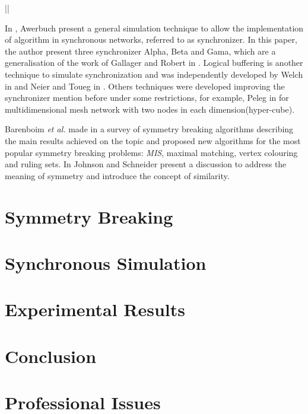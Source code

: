 ||\documentclass[11pt]{article} %
\theoremstyle{plain}
\theoremstyle{definition}
\begin{document}
 

In \cite{awerbuch1985complexity}, Awerbuch present a general simulation technique to allow the implementation of algorithm in synchronous networks, referred to as synchronizer. In this paper, the author present three synchronizer Alpha, Beta and Gama, which are a generalisation of the work of Gallager and Robert in \cite{gallager1982distributed}. Logical buffering is another technique to simulate synchronization and was independently developed by Welch in \cite{welch1987simulating} and Neier and Toueg in \cite{neiger1993simulating}. Others techniques were developed improving the synchronizer mention before under some restrictions, for example, Peleg in \cite{peleg1989optimal} for multidimensional mesh network with two nodes in each dimension(hyper-cube).

 Barenboim \textit{et al.} made in \cite{barenboim2016locality} a survey of symmetry breaking algorithms describing the main results achieved on the topic and proposed new algorithms for the most popular symmetry breaking problems: \textit{MIS}, maximal matching, vertex colouring and ruling sets. In \cite{johnson1985symmetry} Johnson and Schneider present a discussion to address the meaning of symmetry and introduce the concept of similarity.  



\section{Symmetry Breaking} 

\section{Synchronous Simulation}


\section{Experimental Results}


\section{Conclusion}


\section{Professional Issues}




\end{document}
